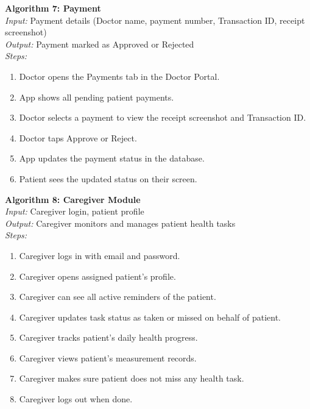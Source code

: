 \documentclass[12pt, a4paper, oneside]{report}
\begin{document}
\textbf{Algorithm 7: Payment}\\
\textit{Input:} Payment details (Doctor name, payment number, Transaction ID, receipt screenshot)\\
\textit{Output:} Payment marked as Approved or Rejected\\
\textit{Steps:}
\begin{enumerate}
    \item Doctor opens the Payments tab in the Doctor Portal.
    \item App shows all pending patient payments.
    \item Doctor selects a payment to view the receipt screenshot and Transaction ID.
    \item Doctor taps Approve or Reject.
    \item App updates the payment status in the database.
    \item Patient sees the updated status on their screen.
\end{enumerate}

\textbf{Algorithm 8: Caregiver Module}\\
\textit{Input:} Caregiver login, patient profile\\
\textit{Output:} Caregiver monitors and manages patient health tasks\\
\textit{Steps:}
\begin{enumerate}
    \item Caregiver logs in with email and password.
    \item Caregiver opens assigned patient's profile.
    \item Caregiver can see all active reminders of the patient.
    \item Caregiver updates task status as taken or missed on behalf of patient.
    \item Caregiver tracks patient's daily health progress.
    \item Caregiver views patient's measurement records.
    \item Caregiver makes sure patient does not miss any health task.
    \item Caregiver logs out when done.
\end{enumerate}
\end{document}
